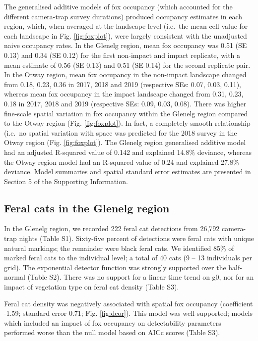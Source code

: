 \documentclass[]{elsarticle} %
\begin{document}
The generalised additive models of fox occupancy (which accounted for the different camera-trap survey durations) produced occupancy estimates in each region, which, when averaged at the landscape level (i.e.~the mean cell value for each landscape in Fig. \ref{fig:foxplot}), were largely consistent with the unadjusted naive occupancy rates. In the Glenelg region, mean fox occupancy was 0.51 (SE 0.13) and 0.34 (SE 0.12) for the first non-impact and impact replicate, with a mean estimate of 0.56 (SE 0.13) and 0.51 (SE 0.14) for the second replicate pair. In the Otway region, mean fox occupancy in the non-impact landscape changed from 0.18, 0.23, 0.36 in 2017, 2018 and 2019 (respective SEs: 0.07, 0.03, 0.11), whereas mean fox occupancy in the impact landscape changed from 0.31, 0.23, 0.18 in 2017, 2018 and 2019 (respective SEs: 0.09, 0.03, 0.08). There was higher fine-scale spatial variation in fox occupancy within the Glenelg region compared to the Otway region (Fig. \ref{fig:foxplot}). In fact, a completely smooth relationship (i.e.~no spatial variation with space was predicted for the 2018 survey in the Otway region (Fig. \ref{fig:foxplot}). The Glenelg region generalised additive model had an adjusted R-squared value of 0.142 and explained 14.8\% deviance, whereas the Otway region model had an R-squared value of 0.24 and explained 27.8\% deviance. Model summaries and spatial standard error estimates are presented in Section 5 of the Supporting Information.

\hypertarget{feral-cats-in-the-glenelg-region}{%
\subsection{Feral cats in the Glenelg region}\label{feral-cats-in-the-glenelg-region}}

In the Glenelg region, we recorded 222 feral cat detections from 26,792 camera-trap nights (Table S1). Sixty-five percent of detections were feral cats with unique natural markings; the remainder were black feral cats. We identified 85\% of marked feral cats to the individual level; a total of 40 cats (9 -- 13 individuals per grid). The exponential detector function was strongly supported over the half-normal (Table S2). There was no support for a linear time trend on g0, nor for an impact of vegetation type on feral cat density (Table S3).

Feral cat density was negatively associated with spatial fox occupancy (coefficient -1.59; standard error 0.71; Fig. \ref{fig:dcor}). This model was well-supported; models which included an impact of fox occupancy on detectability parameters performed worse than the null model based on AICc scores (Table S3).
\end{document}
